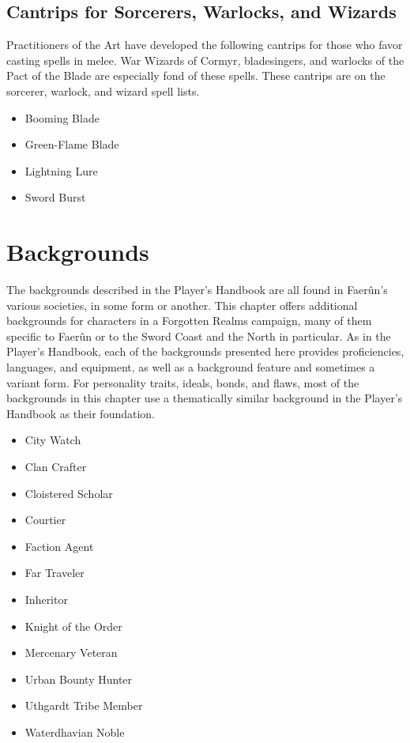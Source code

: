 \documentclass[10pt,a4paper,twoside,twocolumn,openany,bg=print,nodeprecatedcode]{dndbook}
\begin{document}
\section{Cantrips for Sorcerers, Warlocks, and Wizards}
Practitioners of the Art have developed the following cantrips for those who favor casting spells in melee. War Wizards of Cormyr, bladesingers, and warlocks of the Pact of the Blade are especially fond of these spells.
These cantrips are on the sorcerer, warlock, and wizard spell lists.

\begin{itemize}
\item Booming Blade
\item Green-Flame Blade
\item Lightning Lure
\item Sword Burst
\end{itemize}

\chapter{Backgrounds}
The backgrounds described in the Player's Handbook are all found in Faerûn's various societies, in some form or another. This chapter offers additional backgrounds for characters in a Forgotten Realms campaign, many of them specific to Faerûn or to the Sword Coast and the North in particular.
As in the Player's Handbook, each of the backgrounds presented here provides proficiencies, languages, and equipment, as well as a background feature and sometimes a variant form. For personality traits, ideals, bonds, and flaws, most of the backgrounds in this chapter use a thematically similar background in the Player's Handbook as their foundation.

\begin{itemize}
\item City Watch
\item Clan Crafter
\item Cloistered Scholar
\item Courtier
\item Faction Agent
\item Far Traveler
\item Inheritor
\item Knight of the Order
\item Mercenary Veteran
\item Urban Bounty Hunter
\item Uthgardt Tribe Member
\item Waterdhavian Noble
\end{itemize}
\end{document}
